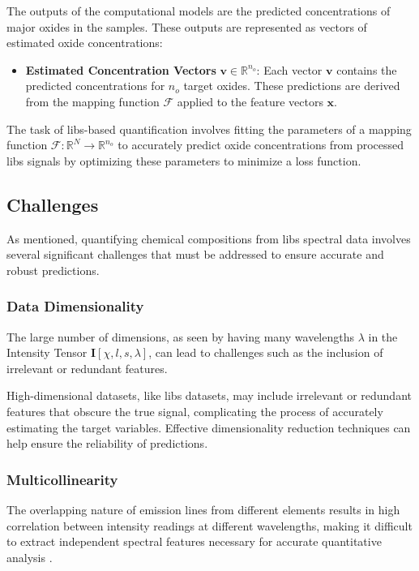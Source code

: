 The outputs of the computational models are the predicted concentrations of major oxides in the samples.
These outputs are represented as vectors of estimated oxide concentrations:

\begin{itemize}
    \item \textbf{Estimated Concentration Vectors} $\mathbf{v} \in \mathbb{R}^{n_o}$: Each vector $\mathbf{v}$ contains the predicted concentrations for $n_o$ target oxides. These predictions are derived from the mapping function $\mathcal{F}$ applied to the feature vectors $\mathbf{x}$.
\end{itemize}

The task of \gls{libs}-based quantification involves fitting the parameters of a mapping function $\mathcal{F}: \mathbb{R}^N \rightarrow \mathbb{R}^{n_o}$ to accurately predict oxide concentrations from processed \gls{libs} signals by optimizing these parameters to minimize a loss function.

\subsection{Challenges}\label{subsec:challenges}
As mentioned, quantifying chemical compositions from \gls{libs} spectral data involves several significant challenges that must be addressed to ensure accurate and robust predictions.

\subsubsection{Data Dimensionality}
The large number of dimensions, as seen by having many wavelengths $\lambda$ in the Intensity Tensor $\mathbf{I}[\chi, l, s, \lambda]$, can lead to challenges such as the inclusion of irrelevant or redundant features.

High-dimensional datasets, like \gls{libs} datasets, may include irrelevant or redundant features that obscure the true signal, complicating the process of accurately estimating the target variables. Effective dimensionality reduction techniques can help ensure the reliability of predictions.

\subsubsection{Multicollinearity}
The overlapping nature of emission lines from different elements results in high correlation between intensity readings at different wavelengths, making it difficult to extract independent spectral features necessary for accurate quantitative analysis \cite{andersonImprovedAccuracyQuantitative2017}.

